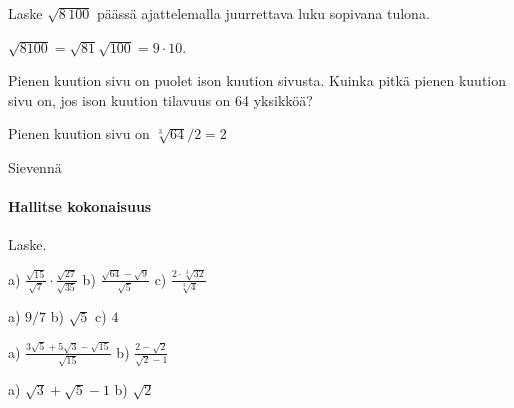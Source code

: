 \begin{tehtavasivu}
\begin{tehtava}
Laske $\sqrt{8\,100}$ päässä ajattelemalla juurrettava luku sopivana tulona.
\begin{vastaus}
$\sqrt{8100}=\sqrt{81}\sqrt{100}=9\cdot 10$.
\end{vastaus}
\end{tehtava}

\begin{tehtava}
Pienen kuution sivu on puolet ison kuution sivusta. Kuinka pitkä pienen kuution sivu on, jos ison kuution tilavuus on 64 yksikköä? \\
\begin{vastaus}
Pienen kuution sivu on $\sqrt[3]{64}/2=2$ 
\end{vastaus}
\end{tehtava}

\begin{tehtava}
 Sievennä
	  \begin{vastaus}
	\end{vastaus}
\end{tehtava}


\paragraph*{Hallitse kokonaisuus}

Laske.

\begin{tehtava}
a) $ \frac{\sqrt{15}}{\sqrt{7}} \cdot  \frac{\sqrt{27}}{\sqrt{35}}$  \quad b)  $ \frac{\sqrt{64}-\sqrt{9}}{\sqrt{5}}$   \quad c)  $ \frac{2 \cdot \sqrt[3]{32}}{\sqrt[3]{4}}$ \quad 
\begin{vastaus}
a) $9/7$ \quad b) $\sqrt{5}$ \quad c) $4$ \quad
\end{vastaus}
\end{tehtava}

\begin{tehtava} 
a) $ \frac{3\sqrt{5}+5\sqrt{3}-\sqrt{15}}{\sqrt{15}}$  \quad b)  $ \frac{2-\sqrt{2}}{\sqrt{2}-1}$   \quad
\begin{vastaus}
a) $\sqrt{3}+\sqrt{5}-1$ \quad b) $\sqrt{2}$ \quad
\end{vastaus}
\end{tehtava}


\end{tehtavasivu}
